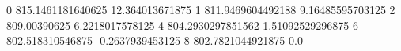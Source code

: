 0 815.1461181640625 12.364013671875
1 811.9469604492188 9.16485595703125
2 809.00390625 6.2218017578125
4 804.2930297851562 1.51092529296875
6 802.518310546875 -0.2637939453125
8 802.7821044921875 0.0
